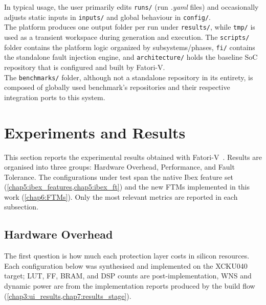  In typical usage, the user primarily edits \texttt{runs/} (run \textit{.yaml} files) and occasionally adjusts static inputs in \texttt{inputs/} and global behaviour in \texttt{config/}.\\
The platform produces one output folder per run under \texttt{results/}, while \texttt{tmp/} is used as a transient workspace during generation and execution. The \texttt{scripts/} folder contains the platform logic organized by subsystems/phases, \texttt{fi/} contains the standalone fault injection engine, and \texttt{architecture/} holds the baseline SoC repository that is configured and built by Fatori-V.\\
The \texttt{benchmarks/} folder, although not a standalone repository in its entirety, is composed of globally used benchmark's repositories and their respective integration ports to this system.


\section{Experiments and Results}
\label{chap9:exp_results}

This section reports the experimental results obtained with \ac{Fatori-V}~\cite{FatoriV}.
Results are organised into three groups: Hardware Overhead, Performance, and
Fault Tolerance. The configurations under test span the native Ibex feature set
(\cref{chap5:ibex_features,chap5:ibex_ft}) and the new \acp{FTM} implemented in this work
(\cref{chap6:FTMs}). Only the most relevant metrics are reported in each subsection.

\subsection{Hardware Overhead}
\label{sec:cost_results}

The first question is how much each protection layer costs in silicon resources. Each
configuration below was synthesised and implemented on the XCKU040 target; LUT, FF, BRAM,
and DSP counts are post-implementation, WNS and dynamic power are from the implementation reports
produced by the build flow (\cref{chap3:ui_results,chap7:results_stage}).

